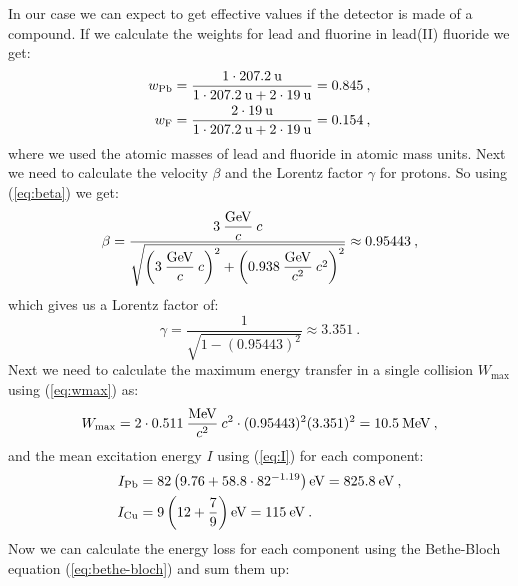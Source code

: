 \documentclass[10pt, titlepage, a4paper]{article}
\numberwithin{equation}{section}
\begin{document}
In our case we can expect to get effective values if the detector is made of a compound. If we calculate the weights for lead and fluorine in lead(II) fluoride we get:
%
\begin{align*}
    w_{\rm{Pb}} = \frac{1\cdot 207.2\>\rm{u}}{1\cdot 207.2\>\rm{u} + 2\cdot 19\>\rm{u}} = 0.845 \>, \\
    w_{\rm{F}} = \frac{2\cdot 19\>\rm{u}}{1\cdot 207.2\>\rm{u} + 2\cdot 19\>\rm{u}} = 0.154 \>,
\end{align*}
%
where we used the atomic masses of lead and fluoride in atomic mass units. Next we need to calculate the velocity $\beta$ and the Lorentz factor $\gamma$ for protons. So using
(\ref{eq:beta}) we get:
%
\begin{equation}
    \beta = \frac{3\>\dfrac{\rm{GeV}}{c}\>c}{\sqrt{\left(3\>\dfrac{\rm{GeV}}{c}\>c\right)^2 + {\left(0.938\>\dfrac{\rm{GeV}}{c^2}\>c^2\right)}^2}} \approx 0.95443\>,
\end{equation}
%
which gives us a Lorentz factor of:
%
\begin{equation}
    \gamma = \frac{1}{\sqrt{1-(0.95443)^2}} \approx 3.351\>.
\end{equation}
%
Next we need to calculate the maximum energy transfer in a single collision $W_{\text{max}}$ using 
(\ref{eq:wmax}) as: 
%
\begin{equation}
    W_{\text{max}} = 2\cdot 0.511\>\frac{\rm{MeV}}{c^2}\>c^2\cdot(0.95443)^2(3.351)^2 = 10.5\>\rm{MeV}\>,
\end{equation}
%
and the mean excitation energy $I$ using (\ref{eq:I}) for each component:
%
\begin{align*}
    I_{\rm{Pb}} &= 82\left(9.76 + 58.8\cdot 82^{-1.19}\right)\rm{eV} = 825.8\>\rm{eV}\>, \\
    I_{\rm{Cu}} &= 9\left(12 + \frac{7}{9}\right)\rm{eV} = 115\>\rm{eV}\>.
\end{align*}
%
Now we can calculate the energy loss for each component using the Bethe-Bloch equation (\ref{eq:bethe-bloch}) and sum them up:
%
\end{document}
